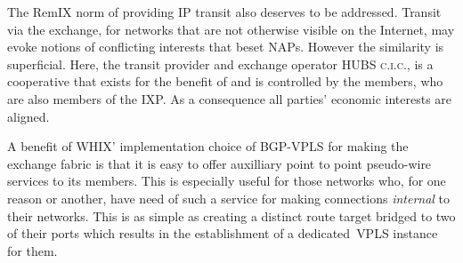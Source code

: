 

The RemIX norm of providing IP transit also deserves to be addressed. Transit
via the exchange, for networks that are not otherwise visible on the Internet,
may evoke notions of conflicting interests that
beset \acp{NAP}. However the similarity is superficial. Here, the transit
provider and exchange operator HUBS \textsc{c.i.c.}, is a cooperative
that exists for the benefit of and is controlled by the members, who
are also members of the \ac{IXP}. As a consequence all parties'
economic interests are aligned.


A benefit of \ac{WHIX}' implementation choice of \ac{BGP}-\ac{VPLS}
for making the exchange fabric is that it is easy to offer auxilliary
point to point pseudo-wire services to its members. This is especially
useful for those networks who, for one reason or another, have need of
such a service for making connections \emph{internal} to their
networks. This is as simple as creating a distinct route target
bridged to two of their ports which results in the establishment of a
dedicated~\ac{VPLS} instance for them.
